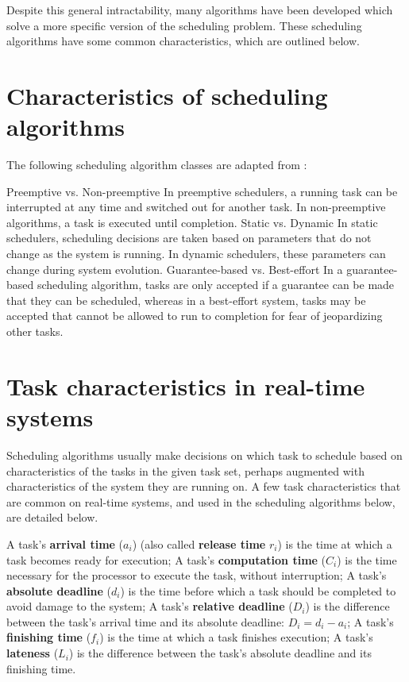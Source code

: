 \documentclass[twoside]{uva-inf-bachelor-thesis}
\begin{document}
Despite this general intractability, many algorithms have been developed which solve a more specific version of the scheduling problem. These scheduling algorithms have some common characteristics, which are outlined below.

\section{Characteristics of scheduling algorithms}
The following scheduling algorithm classes are adapted from \textcite{buttazzo2011hard}:
\begin{outline}
    \1 Preemptive vs. Non-preemptive
        \2 In preemptive schedulers, a running task can be interrupted at any time and switched out for another task.
        \2 In non-preemptive algorithms, a task is executed until completion.
    \1 Static vs. Dynamic
        \2 In static schedulers, scheduling decisions are taken based on parameters that do not change as the system is running. In dynamic schedulers, these parameters can change during system evolution.
    \1 Guarantee-based vs. Best-effort
        \2 In a guarantee-based scheduling algorithm, tasks are only accepted if a guarantee can be made that they can be scheduled, whereas in a best-effort system, tasks may be accepted that cannot be allowed to run to completion for fear of jeopardizing other tasks.
\end{outline}

\section{Task characteristics in real-time systems}
Scheduling algorithms usually make decisions on which task to schedule based on characteristics of the tasks in the given task set, perhaps augmented with characteristics of the system they are running on. A few task characteristics that are common on real-time systems, and used in the scheduling algorithms below, are detailed below.

\begin{outline}
    \1 A task's \textbf{arrival time} ($a_i$) (also called \textbf{release time} $r_i$) is the time at which a task becomes ready for execution;
    \1 A task's \textbf{computation time} ($C_i$) is the time necessary for the processor to execute the task, without interruption;
    \1 A task's \textbf{absolute deadline} ($d_i$) is the time before which a task should be completed to avoid damage to the system;
    \1 A task's \textbf{relative deadline} ($D_i$) is the difference between the task's arrival time and its absolute deadline: $D_i = d_i - a_i$;
    \1 A task's \textbf{finishing time} ($f_i$) is the time at which a task finishes execution;
    \1 A task's \textbf{lateness} ($L_i$) is the difference between the task's absolute deadline and its finishing time.
\end{outline}
\end{document}
